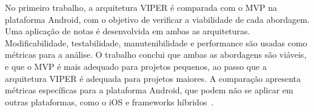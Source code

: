 No primeiro trabalho, a arquitetura VIPER é comparada com o MVP na plataforma Android, com o objetivo de verificar a viabilidade de cada abordagem.
Uma aplicação de notas é desenvolvida em ambas as arquiteturas.
Modificabilidade, testabilidade, manutenibilidade e performance são usadas como métricas para a análise.
O trabalho conclui que ambas as abordagens são viáveis, e que o MVP é mais adequado para projetos pequenos, ao passo que a arquitetura VIPER é adequada para projetos maiores.
A comparação apresenta métricas específicas para a plataforma Android, que podem não se aplicar em outras plataformas, como o iOS e frameworks híbridos~\cite{humeniuk}.